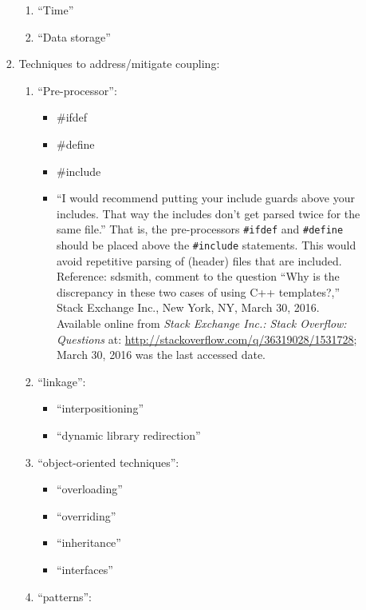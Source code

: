 \begin{enumerate}
\begin{enumerate}
\begin{enumerate}
\begin{enumerate}
			\item ``Time''
			\item ``Data storage''
			\end{enumerate}
		\item Techniques to address/mitigate coupling: \vspace{-0.1cm}
			\begin{enumerate} \itemsep -1pt
			\item ``Pre-processor'': \vspace{-0.1cm}
				\begin{itemize} \itemsep -1pt
				\item \#ifdef
				\item \#define
				\item \#include
				\item ``I would recommend putting your include guards above your includes. That way the includes don't get parsed twice for the same file.'' {\color{red} That is, the pre-processors {\tt \#ifdef} and {\tt \#define} should be placed above the {\tt \#include} statements. This would avoid repetitive parsing of (header) files that are included.} Reference: sdsmith, comment to the question ``Why is the discrepancy in these two cases of using C++ templates?,'' Stack Exchange Inc., New York, NY, March 30, 2016. Available online from {\it Stack Exchange Inc.: Stack Overflow: Questions} at: \url{http://stackoverflow.com/q/36319028/1531728}; March 30, 2016 was the last accessed date.
				\end{itemize}
			\item ``linkage'': \vspace{-0.1cm}
				\begin{itemize} \itemsep -1pt
				\item ``interpositioning''
				\item ``dynamic library redirection''
				\end{itemize}
			\item ``object-oriented techniques'': \vspace{-0.1cm}
				\begin{itemize} \itemsep -1pt
				\item ``overloading''
				\item ``overriding''
				\item ``inheritance''
				\item ``interfaces''
				\end{itemize}
			\item ``patterns'': \vspace{-0.1cm}

\end{enumerate}
\end{enumerate}
\end{enumerate}
\end{enumerate}
